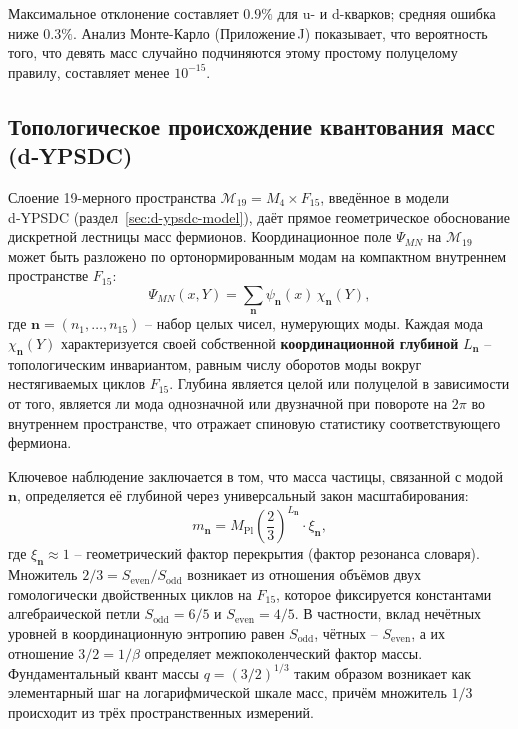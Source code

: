 \documentclass[11pt,a4paper]{article}
\begin{document}
	Максимальное отклонение составляет \(0.9\%\) для u- и d-кварков; средняя ошибка ниже \(0.3\%\).  Анализ Монте-Карло (Приложение J) показывает, что вероятность того, что девять масс случайно подчиняются этому простому полуцелому правилу, составляет менее \(10^{-15}\).
	
	\subsection{Топологическое происхождение квантования масс (d‑YPSDC)}
	\label{subsec:topo-mass}
	\label{sec:d-ypsdc-model}          %
	
	Слоение 19-мерного пространства \(\mathcal{M}_{19}=M_4\times F_{15}\), введённое в модели d‑YPSDC (раздел~\ref{sec:d-ypsdc-model}), даёт прямое геометрическое обоснование дискретной лестницы масс фермионов. Координационное поле \(\Psi_{MN}\) на \(\mathcal{M}_{19}\) может быть разложено по ортонормированным модам на компактном внутреннем пространстве \(F_{15}\):
	\begin{equation}
		\Psi_{MN}(x,Y) = \sum_{\mathbf{n}} \psi_{\mathbf{n}}(x)\, \chi_{\mathbf{n}}(Y),
		\label{eq:mode-exp}
	\end{equation}
	где \(\mathbf{n}=(n_1,\dots,n_{15})\) – набор целых чисел, нумерующих моды.
	Каждая мода \(\chi_{\mathbf{n}}(Y)\) характеризуется своей собственной \textbf{координационной глубиной} \(L_{\mathbf{n}}\) – топологическим инвариантом, равным числу оборотов моды вокруг нестягиваемых циклов \(F_{15}\). Глубина является целой или полуцелой в зависимости от того, является ли мода однозначной или двузначной при повороте на \(2\pi\) во внутреннем пространстве, что отражает спиновую статистику соответствующего фермиона.
	
	Ключевое наблюдение заключается в том, что масса частицы, связанной с модой \(\mathbf{n}\), определяется её глубиной через универсальный закон масштабирования:
	\begin{equation}
		m_{\mathbf{n}} = M_{\mathrm{Pl}} \left( \frac{2}{3} \right)^{L_{\mathbf{n}}} \cdot \xi_{\mathbf{n}},
		\label{eq:mass-L}
	\end{equation}
	где \(\xi_{\mathbf{n}} \approx 1\) – геометрический фактор перекрытия (фактор резонанса словаря). Множитель \(2/3 = S_{\mathrm{even}}/S_{\mathrm{odd}}\) возникает из отношения объёмов двух гомологически двойственных циклов на \(F_{15}\), которое фиксируется константами алгебраической петли \(S_{\mathrm{odd}}=6/5\) и \(S_{\mathrm{even}}=4/5\). В частности, вклад нечётных уровней в координационную энтропию равен \(S_{\mathrm{odd}}\), чётных – \(S_{\mathrm{even}}\), а их отношение \(3/2 = 1/\beta\) определяет межпоколенческий фактор массы. Фундаментальный квант массы \(q = (3/2)^{1/3}\) таким образом возникает как элементарный шаг на логарифмической шкале масс, причём множитель \(1/3\) происходит из трёх пространственных измерений.
	
\end{document}
